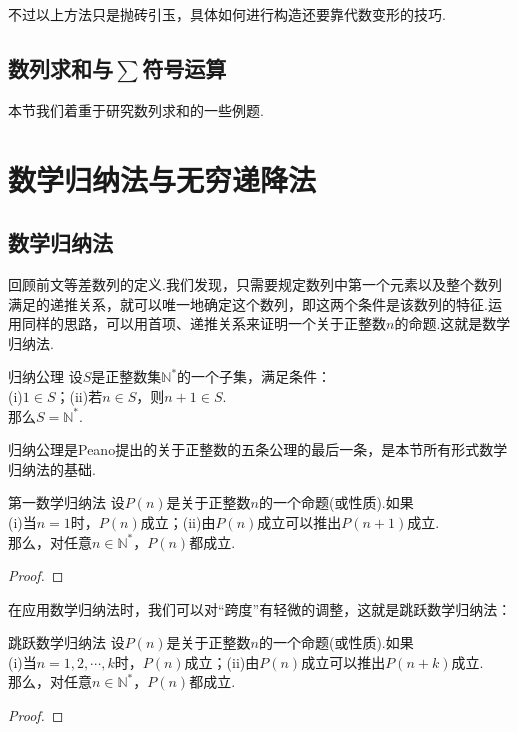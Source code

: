 \documentclass[lang=cn, zihao=5]{elegantbook}
\begin{document}
不过以上方法只是抛砖引玉，具体如何进行构造还要靠代数变形的技巧.

\subsection{数列求和与$\sum$符号运算}

本节我们着重于研究数列求和的一些例题.

\section{数学归纳法与无穷递降法}

\subsection{数学归纳法}

回顾前文等差数列的定义.我们发现，只需要规定数列中第一个元素以及整个数列满足的递推关系，就可以唯一地确定这个数列，即这两个条件是该数列的特征.运用同样的思路，可以用首项、递推关系来证明一个关于正整数$n$的命题.这就是数学归纳法.

\begin{axiom}{归纳公理}
	设$S$是正整数集$\mathbb{N}^{*}$的一个子集，满足条件： \\
	(i)$1 \in S$；(ii)若$n \in S$，则$n+1 \in S$. \\
	那么$S = \mathbb{N}^{*}$.
\end{axiom}
\begin{remark}
	归纳公理是Peano提出的关于正整数的五条公理的最后一条，是本节所有形式数学归纳法的基础.
\end{remark}

\begin{theorem}{第一数学归纳法}
	设$P(n)$是关于正整数$n$的一个命题(或性质).如果 \\
	(i)当$n=1$时，$P(n)$成立；(ii)由$P(n)$成立可以推出$P(n+1)$成立. \\
	那么，对任意$n \in \mathbb{N}^{*}$，$P(n)$都成立.
\end{theorem}
\begin{proof}
\end{proof}

在应用数学归纳法时，我们可以对“跨度”有轻微的调整，这就是跳跃数学归纳法：

\begin{corollary}{跳跃数学归纳法}
	设$P(n)$是关于正整数$n$的一个命题(或性质).如果 \\
	(i)当$n=1,2, \cdots ,k$时，$P(n)$成立；(ii)由$P(n)$成立可以推出$P(n+k)$成立. \\
	那么，对任意$n \in \mathbb{N}^{*}$，$P(n)$都成立.
\end{corollary}
\begin{proof}
\end{proof}
\end{document}

